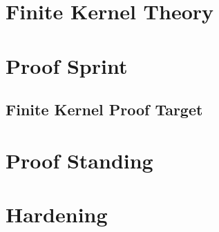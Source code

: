 \documentclass[11pt,oneside,openany]{book}
\begin{document}
\frontmatter



\tableofcontents
\mainmatter
\part{Finite Kernel Theory}

\part{Proof Sprint}
\chapter{Finite Kernel Proof Target}


\part{Proof Standing}





\part{Hardening}



\end{document}
